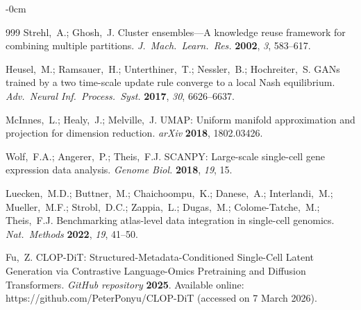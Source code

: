 \documentclass[biology,article,submit,pdftex,moreauthors]{Definitions/mdpi}
\begin{document}
\begin{adjustwidth}{-\extralength}{0cm}
\begin{thebibliography}{999}
Strehl,~A.; Ghosh,~J. Cluster ensembles---A knowledge reuse framework for combining multiple partitions. {\em J.\ Mach.\ Learn.\ Res.} {\bf 2002}, {\em 3}, 583--617.

Heusel,~M.; Ramsauer,~H.; Unterthiner,~T.; Nessler,~B.; Hochreiter,~S. GANs trained by a two time-scale update rule converge to a local Nash equilibrium. {\em Adv.\ Neural Inf.\ Process.\ Syst.} {\bf 2017}, {\em 30}, 6626--6637.

McInnes,~L.; Healy,~J.; Melville,~J. UMAP: Uniform manifold approximation and projection for dimension reduction. {\em arXiv} {\bf 2018}, 1802.03426.

Wolf,~F.A.; Angerer,~P.; Theis,~F.J. SCANPY: Large-scale single-cell gene expression data analysis. {\em Genome Biol.} {\bf 2018}, {\em 19}, 15.

Luecken,~M.D.; Buttner,~M.; Chaichoompu,~K.; Danese,~A.; Interlandi,~M.; Mueller,~M.F.; Strobl,~D.C.; Zappia,~L.; Dugas,~M.; Colome-Tatche,~M.; Theis,~F.J. Benchmarking atlas-level data integration in single-cell genomics. {\em Nat.\ Methods} {\bf 2022}, {\em 19}, 41--50.

Fu,~Z. CLOP-DiT: Structured-Metadata-Conditioned Single-Cell Latent Generation via Contrastive Language-Omics Pretraining and Diffusion Transformers. {\em GitHub repository} {\bf 2025}. Available online: https://github.com/PeterPonyu/CLOP-DiT (accessed on 7 March 2026).

\end{thebibliography}

%



\end{adjustwidth}
\end{document}
